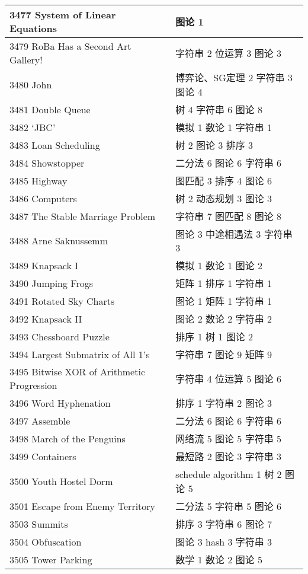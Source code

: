 \begin{longtable}{| p{} | p{} |}
 3477 System of Linear Equations  & 图论 1 \\ \hline
 3479 RoBa Has a Second Art Gallery!  & 字符串 2 位运算 3 图论 3 \\ \hline
 3480 John  & 博弈论、SG定理 2 字符串 3 图论 4 \\ \hline
 3481 Double Queue  & 树 4 字符串 6 图论 8 \\ \hline
 3482 ‘JBC’  & 模拟 1 数论 1 字符串 1 \\ \hline
 3483 Loan Scheduling  & 树 2 图论 3 排序 3 \\ \hline
 3484 Showstopper  & 二分法 6 图论 6 字符串 6 \\ \hline
 3485 Highway  & 图匹配 3 排序 4 图论 6 \\ \hline
 3486 Computers  & 树 2 动态规划 3 图论 3 \\ \hline
 3487 The Stable Marriage Problem  & 字符串 7 图匹配 8 图论 8 \\ \hline
 3488 Arne Saknussemm  & 图论 3 中途相遇法 3 字符串 3 \\ \hline
 3489 Knapsack I  & 模拟 1 数论 1 图论 2 \\ \hline
 3490 Jumping Frogs  & 矩阵 1 排序 1 字符串 1 \\ \hline
 3491 Rotated Sky Charts  & 图论 1 矩阵 1 字符串 1 \\ \hline
 3492 Knapsack II  & 图论 2 数论 2 字符串 2 \\ \hline
 3493 Chessboard Puzzle  & 排序 1 树 1 图论 2 \\ \hline
 3494 Largest Submatrix of All 1’s  & 字符串 7 图论 9 矩阵 9 \\ \hline
 3495 Bitwise XOR of Arithmetic Progression  & 字符串 4 位运算 5 图论 6 \\ \hline
 3496 Word Hyphenation  & 排序 1 字符串 2 图论 3 \\ \hline
 3497 Assemble  & 二分法 6 图论 6 字符串 6 \\ \hline
 3498 March of the Penguins  & 网络流 5 图论 5 字符串 5 \\ \hline
 3499 Containers  & 最短路 2 图论 3 字符串 3 \\ \hline
 3500 Youth Hostel Dorm  & schedule algorithm 1 树 2 图论 5 \\ \hline
 3501 Escape from Enemy Territory  & 二分法 5 字符串 5 图论 6 \\ \hline
 3503 Summits  & 排序 3 字符串 6 图论 7 \\ \hline
 3504 Obfuscation  & 图论 3 hash 3 字符串 3 \\ \hline
 3505 Tower Parking  & 数学 1 数论 2 图论 5 \\ \hline

\end{longtable}
